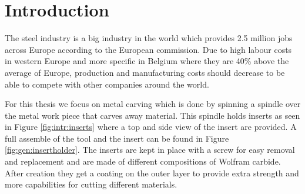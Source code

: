 
\chapter{Introduction}

    The steel industry is a big industry in the world which provides 2.5 million jobs across Europe according to the European commission. Due to high labour costs in western Europe and more specific in Belgium where they are 40\% above the average of Europe, production and manufacturing costs should decrease to be able to compete with other companies around the world. 
    
For this thesis we focus on metal carving which is done by spinning a spindle over the metal work piece that carves away material. This spindle holds inserts as seen in Figure \ref{fig:intr:inserts} where a top and side view of the insert are provided. A full assemble of the tool and the insert can be found in Figure \ref{fig:gen:insertholder}. The inserts are kept in place with a screw for easy removal and replacement and are made of different compositions of Wolfram carbide. After creation they get a coating on the outer layer to provide extra strength and more capabilities for cutting different materials. 

